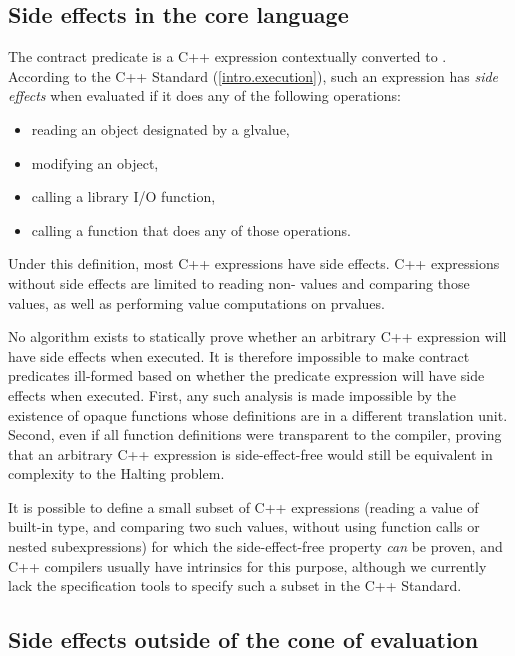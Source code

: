 \subsection{Side effects in the core language}
\label{subsec:core}

The contract predicate is a C++ expression contextually converted to . According to the C++ Standard (\href{https://eel.is/c++draft/intro.execution#7}{[intro.execution]}), such an expression has \emph{side effects} when evaluated if it does any of the following operations:
\begin{itemize}
\item reading an object designated by a  glvalue,
\item modifying an object,
\item calling a library I/O function,
\item calling a function that does any of those operations.
\end{itemize}
Under this definition, most C++ expressions have side effects. C++ expressions without side effects are limited to reading non- values and comparing those values, as well as performing value computations on prvalues.

No algorithm exists to statically prove whether an arbitrary C++ expression will have side effects when executed. It is therefore impossible to make contract predicates ill-formed based on whether the predicate expression will have side effects when executed. First, any such analysis is made impossible by the existence of opaque functions whose definitions are in a different translation unit. Second, even if all function definitions were transparent to the compiler, proving that an arbitrary C++ expression is side-effect-free would still be equivalent in complexity to the Halting problem.

It is possible to define a small subset of C++ expressions (reading a value of built-in type, and comparing two such values, without using function calls or nested subexpressions) for which the side-effect-free property \emph{can} be proven, and C++ compilers usually have intrinsics for this purpose, although we currently lack the specification tools to specify such a subset in the C++ Standard.

\subsection{Side effects outside of the cone of evaluation}
\label{subsec:cone}

